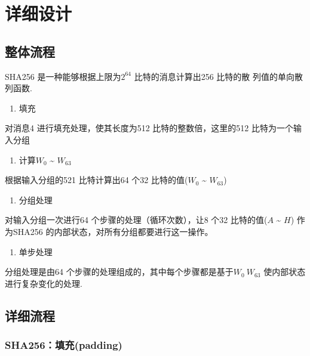 \documentclass[hyperref,]{ctexart}
\providecommand{\tightlist}{%
  \setlength{\itemsep}{0pt}\setlength{\parskip}{0pt}}
\begin{document}
\section{详细设计}

\subsection{整体流程}

SHA256 是一种能够根据上限为\(2^{64}\) 比特的消息计算出256 比特的散
列值的单向散列函数.

\begin{enumerate}
\def\labelenumi{\arabic{enumi}.}
\tightlist
\item
  填充
\end{enumerate}

对消息4 进行填充处理，使其长度为512 比特的整数倍，这里的512
比特为一个输入分组

\begin{enumerate}
\def\labelenumi{\arabic{enumi}.}
\setcounter{enumi}{1}
\tightlist
\item
  计算\(W_0\) \textasciitilde{} \(W_{63}\)
\end{enumerate}

根据输入分组的521 比特计算出64 个32 比特的值(\(W_0\) \textasciitilde{}
\(W_{63}\))

\begin{enumerate}
\def\labelenumi{\arabic{enumi}.}
\setcounter{enumi}{2}
\tightlist
\item
  分组处理
\end{enumerate}

对输入分组一次进行64 个步骤的处理（循环次数），让8 个32 比特的值(\(A\)
\textasciitilde{} \(H\)) 作为SHA256
的内部状态，对所有分组都要进行这一操作。

\begin{enumerate}
\def\labelenumi{\arabic{enumi}.}
\setcounter{enumi}{3}
\tightlist
\item
  单步处理
\end{enumerate}

分组处理是由64 个步骤的处理组成的，其中每个步骤都是基于\(W_0~W_{63}\)
使内部状态进行复杂变化的处理.

\subsection{详细流程}

\hypertarget{sha256padding}{%
\subsubsection{SHA256：填充(padding)}\label{sha256padding}}
\end{document}
